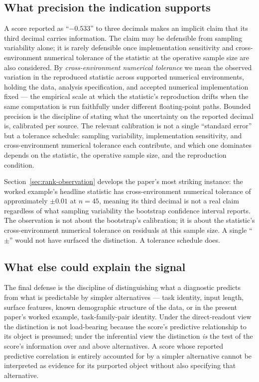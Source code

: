 \documentclass[10pt]{article}
\begin{document}
\subsection{What precision the indication supports}
\label{sec:framework-precision}

A score reported as ``$-0.533$'' to three decimals makes an
implicit claim that its third decimal carries information. The
claim may be defensible from sampling variability alone; it is
rarely defensible once implementation sensitivity and
cross-environment numerical tolerance of the statistic at the
operative sample size are also considered. By
\emph{cross-environment numerical tolerance} we mean the observed
variation in the reproduced statistic across supported numerical
environments, holding the data, analysis specification, and
accepted numerical implementation fixed --- the empirical scale
at which the statistic's reproduction drifts when the same
computation is run faithfully under different floating-point
paths. Bounded precision is the
discipline of stating what the uncertainty on the reported
decimal is, calibrated per source. The relevant calibration is
not a single ``standard error'' but a tolerance schedule:
sampling variability, implementation sensitivity, and
cross-environment numerical tolerance each contribute, and which
one dominates depends on the statistic, the operative sample
size, and the reproduction condition.

Section~\ref{sec:rank-observation} develops the paper's most
striking instance: the worked example's headline statistic has
cross-environment numerical tolerance of approximately $\pm 0.01$
at $n = 45$, meaning its third decimal is not a real claim
regardless of what sampling variability the bootstrap confidence
interval reports. The observation is not about the bootstrap's
calibration; it is about the statistic's cross-environment
numerical tolerance on residuals at this sample size. A single
``$\pm$'' would not have surfaced the distinction. A tolerance
schedule does.

\subsection{What else could explain the signal}
\label{sec:framework-confound}

The final defense is the discipline of distinguishing what a
diagnostic predicts from what is predictable by simpler alternatives
--- task identity, input length, surface features, known demographic
structure of the data, or in the present paper's worked example,
task-family-pair identity. Under the direct-readout view the
distinction is not load-bearing because the score's predictive
relationship to its object is presumed; under the inferential view
the distinction \emph{is} the test of the score's information over
and above alternatives. A score whose reported predictive
correlation is entirely accounted for by a simpler alternative
cannot be interpreted as evidence for its purported object
without also specifying that alternative.
\end{document}
